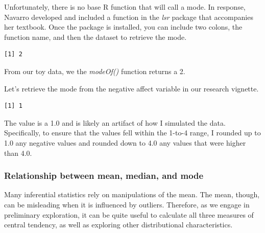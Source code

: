 \documentclass[
  11pt,
]{book}
\newenvironment{Shaded}{\begin{snugshade}}{\end{snugshade}}
\newcommand{\FunctionTok}[1]{\textcolor[rgb]{0.00,0.00,0.00}{#1}}
\newcommand{\NormalTok}[1]{#1}
\newcommand{\SpecialCharTok}[1]{\textcolor[rgb]{0.00,0.00,0.00}{#1}}
\begin{document}
Unfortunately, there is no base R function that will call a mode. In response, Navarro developed and included a function in the \emph{lsr} package that accompanies her \citeyearpar{navarro_book_2020} textbook. Once the package is installed, you can include two colons, the function name, and then the dataset to retrieve the mode.

\begin{Shaded}
\end{Shaded}

\begin{verbatim}
[1] 2
\end{verbatim}

From our toy data, we the \emph{modeOf()} function returns a 2.

Let's retrieve the mode from the negative affect variable in our research vignette.

\begin{Shaded}
\end{Shaded}

\begin{verbatim}
[1] 1
\end{verbatim}

The value is a 1.0 and is likely an artifact of how I simulated the data. Specifically, to ensure that the values fell within the 1-to-4 range, I rounded up to 1.0 any negative values and rounded down to 4.0 any values that were higher than 4.0.

\hypertarget{relationship-between-mean-median-and-mode}{%
\subsubsection{Relationship between mean, median, and mode}\label{relationship-between-mean-median-and-mode}}

Many inferential statistics rely on manipulations of the mean. The mean, though, can be misleading when it is influenced by outliers. Therefore, as we engage in preliminary exploration, it can be quite useful to calculate all three measures of central tendency, as well as exploring other distributional characteristics.
\end{document}
